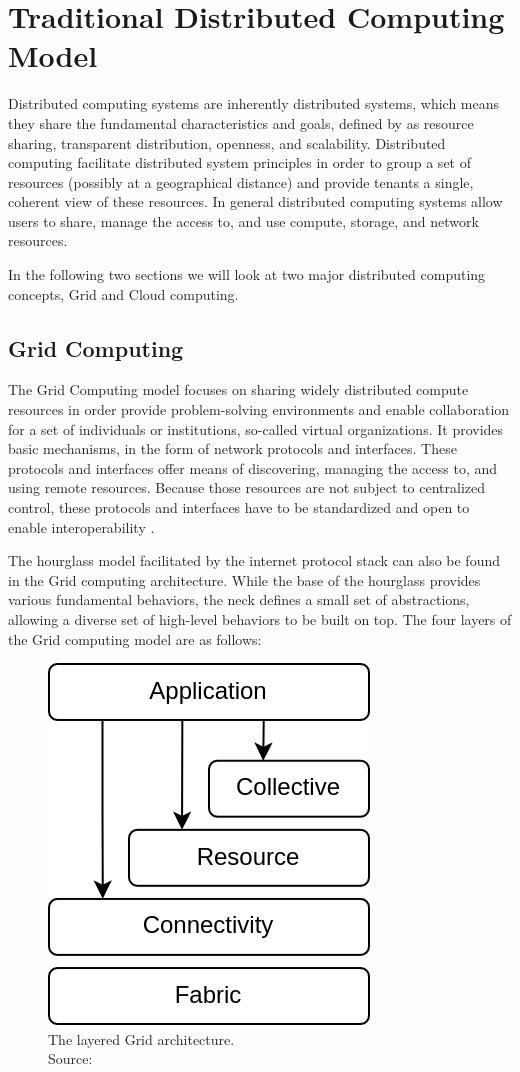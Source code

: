 \section{Traditional Distributed Computing Model}
\label{sec:traditional-distributed-computing}

Distributed computing systems are inherently distributed systems, which means
they share the fundamental characteristics and goals, defined by
\citeauthor{tannenbaum2017} \cite{tannenbaum2017} as resource sharing,
transparent distribution, openness, and scalability. Distributed computing
facilitate distributed system principles in order to group a set of resources
(possibly at a geographical distance) and provide tenants a single, coherent
view of these resources. In general distributed computing systems allow users to
share, manage the access to, and use compute, storage, and network resources.

In the following two sections we will look at two major distributed computing
concepts, Grid and Cloud computing.

\subsection{Grid Computing}

The Grid Computing model focuses on sharing widely distributed compute resources
in order provide problem-solving environments and enable collaboration for a set
of individuals or institutions, so-called virtual organizations. It provides
basic mechanisms, in the form of network protocols and interfaces. These
protocols and interfaces offer means of discovering, managing the access to, and
using remote resources. Because those resources are not subject to centralized
control, these protocols and interfaces have to be standardized and open to
enable interoperability \cite{foster2001grid}.

The hourglass model facilitated by the internet protocol stack can also be found
in the Grid computing architecture. While the base of the hourglass provides
various fundamental behaviors, the neck defines a small set of abstractions,
allowing a diverse set of high-level behaviors to be built on top. The four
layers of the Grid computing model are as follows:

\begin{figure}[H]
  \centering
  \includegraphics[width=0.3\linewidth]{resources/grid-architecture.drawio.png}
  \caption[The layered Grid architecture.]{
    The layered Grid architecture.\\
    Source: \citeauthor{foster2001grid} \cite{foster2001grid}
  }
  \label{fig:grid-architecture}
\end{figure}

